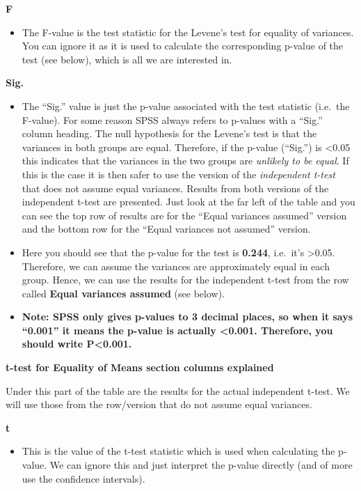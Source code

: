 \documentclass[
]{book}
\providecommand{\tightlist}{%
  \setlength{\itemsep}{0pt}\setlength{\parskip}{0pt}}
\begin{document}
\textbf{F}

\begin{itemize}
\tightlist
\item
  The F-value is the test statistic for the Levene's test for equality of variances. You can ignore it as it is used to calculate the corresponding p-value of the test (see below), which is all we are interested in.
\end{itemize}

\textbf{Sig.}

\begin{itemize}
\item
  The ``Sig.'' value is just the p-value associated with the test statistic (i.e.~the F-value). For some reason SPSS always refers to p-values with a ``Sig.'' column heading. The null hypothesis for the Levene's test is that the variances in both groups are equal. Therefore, if the p-value (``Sig.'') is \textless0.05 this indicates that the variances in the two groups are \emph{unlikely to be equal}. If this is the case it is then safer to use the version of the \emph{independent t-test} that does not assume equal variances. Results from both versions of the independent t-test are presented. Just look at the far left of the table and you can see the top row of results are for the ``Equal variances assumed'' version and the bottom row for the ``Equal variances not assumed'' version.
\item
  Here you should see that the p-value for the test is \textbf{0.244}, i.e.~it's \textgreater0.05. Therefore, we can assume the variances are approximately equal in each group. Hence, we can use the results for the independent t-test from the row called \textbf{Equal variances assumed} (see below).
\item
  \textbf{Note: SPSS only gives p-values to 3 decimal places, so when it says ``0.001'' it means the p-value is actually \textless0.001. Therefore, you should write P\textless0.001.}
\end{itemize}

\textbf{t-test for Equality of Means section columns explained}

Under this part of the table are the results for the actual independent t-test. We will use those from the row/version that do not assume equal variances.

\textbf{t}

\begin{itemize}
\tightlist
\item
  This is the value of the t-test statistic which is used when calculating the p-value. We can ignore this and just interpret the p-value directly (and of more use the confidence intervals).
\end{itemize}
\end{document}
